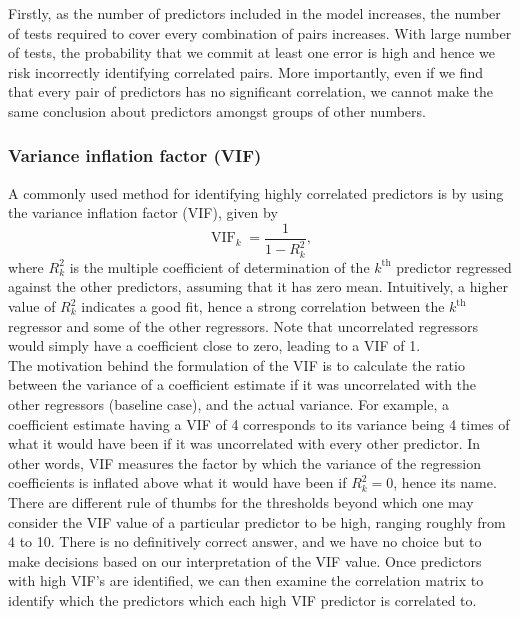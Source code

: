 \documentclass[12pt]{article}
\DeclareMathOperator{\vif}{VIF}
\begin{document}
	Firstly, as the number of predictors included in the model increases, the number of tests required to cover every combination of pairs increases. With large number of tests, the probability that we commit at least one error is high and hence we risk incorrectly identifying correlated pairs. More importantly, even if we find that every pair of predictors has no significant correlation, we cannot make the same conclusion about predictors amongst groups of other numbers. 
	
	\subsubsection{Variance inflation factor (VIF)\label{sec:311}}
	A commonly used method for identifying highly correlated predictors is by using the variance inflation factor (VIF), given by
	\begin{equation}
		\vif_k=\frac{1}{1-R_{k}^2},
	\end{equation}
	where $R^2_k$ is the multiple coefficient of determination of the $k^{\text{th}}$ predictor regressed against the other predictors, assuming that it has zero mean. Intuitively, a higher value of $R^2_k$ indicates a good fit, hence a strong correlation between the $k^{\text{th}}$ regressor and some of the other regressors. Note that uncorrelated regressors would simply have a coefficient close to zero, leading to a VIF of 1.\cite{James2023}\\
	
	The motivation behind the formulation of the VIF is to calculate the ratio between the variance of a coefficient estimate if it was uncorrelated with the other regressors (baseline case), and the actual variance. For example, a coefficient estimate having a VIF of 4 corresponds to its variance being 4 times of what it would have been if it was uncorrelated with every other predictor. In other words, VIF measures the factor by which the variance of the regression coefficients is inflated above what it would have been if $R_k^2=0$, hence its name. \\
	
	There are different rule of thumbs for the thresholds beyond which one may consider the VIF value of a particular predictor to be high, ranging roughly from 4 to 10.\cite{OBrien2007} There is no definitively correct answer, and we have no choice but to make decisions based on our interpretation of the VIF value. Once predictors with high VIF's are identified, we can then examine the correlation matrix to identify which the predictors which each high VIF predictor is correlated to.
	
\end{document}
